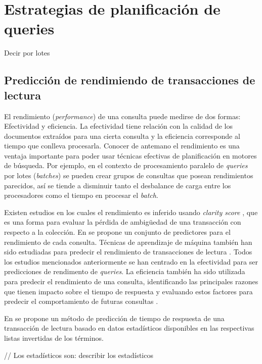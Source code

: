 \chapter{Estrategias de planificación de queries}
\label{cap:epq}

Decir por lotes

\section{Predicción de rendimiendo de transacciones de lectura}
\label{scheduling:prtl}
El rendimiento (\textit{performance}) de una consulta puede medirse de dos formas: Efectividad y eficiencia. La efectividad tiene relación con la calidad de los documentos extraídos para una cierta consulta y la eficiencia corresponde al tiempo que conlleva procesarla. Conocer de antemano el rendimiento es una ventaja importante para poder usar técnicas efectivas de planificación en motores de búsqueda. Por ejemplo, en el contexto de procesamiento paralelo de \textit{queries} por lotes (\textit{batches}) se pueden crear grupos de consultas que posean rendimientos parecidos, así se tiende a disminuir tanto el desbalance de carga entre los procesadores como el tiempo en procesar el \textit{batch}.

Existen estudios en los cuales el rendimiento es inferido usando \textit{clarity score} \citep{Cronen-Townsend:2002}, que es una forma para evaluar la pérdida de ambigüedad de una transacción con respecto a la colección. En \citep{He:2004} se propone un conjunto de predictores para el rendimiento de cada consulta. Técnicas de aprendizaje de máquina también han sido estudiadas para predecir el rendimiento de transacciones de lectura \citep{Si:2002}. Todos los estudios mencionados anteriormente se han centrado en la efectividad para ser predicciones de rendimento de \textit{queries}. La eficiencia también ha sido utilizada para predecir el rendimiento de una consulta, identificando las principales razones que tienen impacto sobre el tiempo de respuesta y evaluando estos factores para predecir el comportamiento de futuras consultas \citep{Tonellotto:2011}.

En \citep{Macdonald:2012} se propone un método de predicción de tiempo de respuesta de una transacción de lectura basado en datos estadísticos disponibles en las respectivas listas invertidas de los términos.

// Los estadísticos son: describir los estadísticos
  

